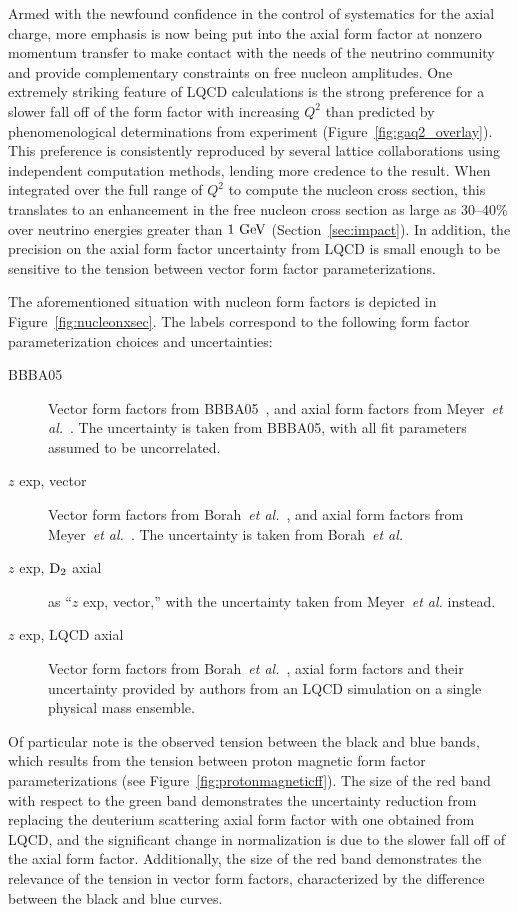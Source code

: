 \documentclass{ar-1col}
\newcommand{\change}[1]{{\color{red} #1}}
\begin{document}
Armed with the newfound confidence in the control of systematics for the axial charge,
 more emphasis is now being put into the \change{axial} form factor at nonzero momentum transfer
to make contact with the needs of the neutrino community and provide
 complementary constraints on free nucleon amplitudes.
One extremely striking feature of LQCD calculations is the strong preference for a slower
fall off of the form factor with increasing $Q^2$ than predicted by phenomenological determinations from experiment (Figure~\ref{fig:gaq2_overlay}).
This preference is consistently reproduced by several lattice collaborations using
independent computation methods, lending more credence to the result.
When integrated over the full range of $Q^2$ to compute the nucleon cross section,
this translates to an enhancement in the free nucleon cross section as large as 30--40\%
over neutrino energies greater than $1~{\rm GeV}$ (Section~\ref{sec:impact}).
In addition, the precision on the axial form factor uncertainty from LQCD
is small enough to be sensitive to the tension between vector form factor parameterizations.

The aforementioned situation with nucleon form factors is depicted in Figure~\ref{fig:nucleonxsec}.
The labels correspond to the following form factor parameterization choices and uncertainties:
\begin{description}
 \item[BBBA05] Vector form factors from BBBA05~\cite{Bradford:2006yz},
 and axial form factors from Meyer~{\it et al.}~\cite{Meyer:2016oeg}.
 The uncertainty is taken from BBBA05, with all fit parameters assumed to be uncorrelated.
 \item[$z$ exp, vector] Vector form factors from Borah~{\it et al.}~\cite{Borah:2020gte},
 and axial form factors from Meyer~{\it et al.}~\cite{Meyer:2016oeg}.
 The uncertainty is taken from Borah~{\it et al.}
 \item[$z$ exp, ${\rm D}_{2}$ axial] as ``$z$ exp, vector,''
 with the uncertainty taken from Meyer~{\it et al.} instead.
 \item[$z$ exp, LQCD axial] Vector form factors from Borah~{\it et al.}~\cite{Borah:2020gte},
 axial form factors and their uncertainty provided by authors from an LQCD simulation
 on a single physical mass ensemble.
\end{description}
Of particular note is the observed tension between the black and blue bands,
 which results from the tension between proton magnetic form factor parameterizations
 (see Figure~\ref{fig:protonmagneticff}).
The size of the red band with respect to the green band demonstrates the uncertainty reduction from replacing the deuterium scattering axial form factor with one obtained from LQCD, and the significant change in normalization is due to the slower fall off of the axial form factor.
Additionally, the size of the red band demonstrates the relevance of the tension in vector form factors, characterized by the difference between the black and blue curves.
\end{document}
